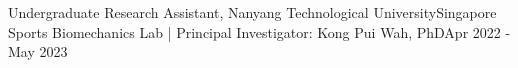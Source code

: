 \documentclass[../main.tex]{subfiles}
\begin{document}
    \resumeSubheading
      {Undergraduate Research Assistant, Nanyang Technological University}{Singapore}
      {Sports Biomechanics Lab | Principal Investigator: Kong Pui Wah, PhD}{Apr 2022 - May 2023}


\end{document}
